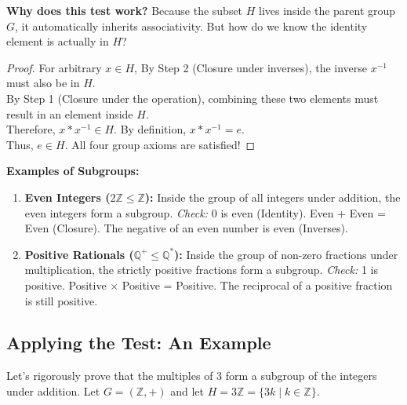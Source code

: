 \documentclass[12pt]{article}
\begin{document}
\textbf{Why does this test work?}
Because the subset $H$ lives inside the parent group $G$, it automatically inherits associativity.
But how do we know the identity element is actually in $H$?
\begin{proof}
    For arbitrary $x \in{H}$,
    By Step 2 (Closure under inverses), the inverse $x^{-1}$ must also be in $H$. \\
    By Step 1 (Closure under the operation), combining these two elements must result in an element inside $H$. \\
    Therefore, $x * x^{-1} \in H$. By definition, $x * x^{-1} = e$. \\
    Thus, $e \in H$. All four group axioms are satisfied!
\end{proof}

\textbf{Examples of Subgroups:}
\begin{enumerate}
    \item \textbf{Even Integers ($2\mathbb{Z} \leq \mathbb{Z}$):}
          Inside the group of all integers under addition, the even integers form a subgroup.
          \textit{Check:} 0 is even (Identity). Even + Even = Even (Closure). The negative of an even number is even (Inverses).

    \item \textbf{Positive Rationals ($\mathbb{Q}^+ \leq \mathbb{Q}^*$):}
          Inside the group of non-zero fractions under multiplication, the strictly positive fractions form a subgroup.
          \textit{Check:} 1 is positive. Positive $\times$ Positive = Positive. The reciprocal of a positive fraction is still positive.
\end{enumerate}

\subsection*{Applying the Test: An Example}

Let's rigorously prove that the multiples of 3 form a subgroup of the integers under addition. Let $G = (\mathbb{Z}, +)$ and let $H = 3\mathbb{Z} = \{3k \mid k \in \mathbb{Z}\}$.
\end{document}
